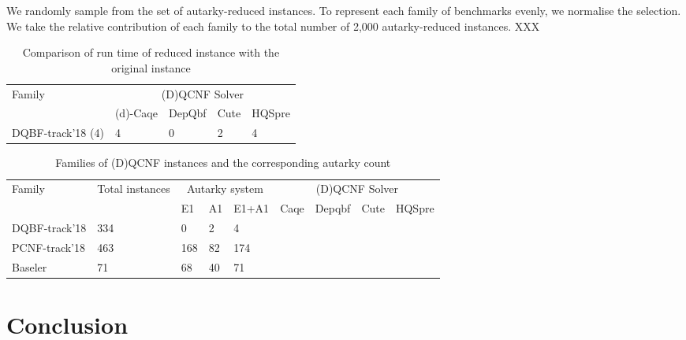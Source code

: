 \documentclass[runningheads]{llncs}
\begin{document}
We randomly sample from the set of autarky-reduced instances. To represent each family of benchmarks evenly, we normalise the selection. We take the relative contribution of each family to the total number of 2,000 autarky-reduced instances. XXX

\begin{table}
\caption{Comparison of run time of reduced instance with the original instance}\label{tab:solver-cmp}
\begin{tabular}{l|l|l|l|l}

\hline
    \multirow{2}{3cm}{Family}  & \multicolumn{4}{c}{(D)QCNF Solver} \\
    \cline{2-5}
   & (d)-Caqe & DepQbf & Cute & HQSpre  \\
    
\hline

DQBF-track'18 (4) &  4 & 0 & 2 & 4 \\

\hline
\end{tabular}
\end{table}

\begin{table}
\caption{Families of (D)QCNF instances and the corresponding autarky count}\label{tab:aut-results}
\begin{tabular}{l|l|l|l|l|l|l|l|l}

\hline
    \multirow{2}{3cm}{Family} &  \multirow{2}{2cm}{Total instances} & \multicolumn{3}{c}{Autarky system} & \multicolumn{4}{c}{(D)QCNF Solver} \\
    \cline{3-9}
   & & E1 & A1 & E1+A1 & Caqe& Depqbf & Cute & HQSpre\\
    
\hline

DQBF-track'18 &  334 & 0 & 2 & 4 \\ \hline
PCNF-track'18 &  463 & 168 & 82 & 174 \\ \hline
Baseler & 71 & 68 & 40 & 71 \\
 

\hline
\end{tabular}
\end{table}

\section{Conclusion}
\label{sec:conclusion}
\end{document}
